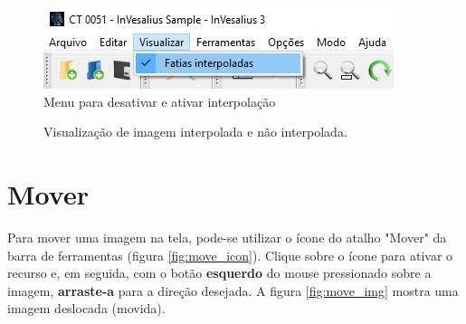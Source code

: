 \begin{figure}[!htb]
\centering
\includegraphics[scale=0.6]{../user_guide_figures/invesalius_screen/menu_interpoleted_image_pt.png}
\caption{Menu para desativar e ativar interpolação}
\label{fig:menu_interpoleted_image_pt}
\end{figure}


\begin{figure}[!htb]
  \centering
    \qquad
  \hfill
  \caption{Visualização de imagem interpolada e não interpolada.}
  \label{fig:interp}
\end{figure}

\section{Mover}

Para mover uma imagem na tela, pode-se utilizar o ícone do atalho "Mover" da barra de ferramentas (figura
\ref{fig:move_icon}). Clique sobre o ícone para ativar o recurso e, em seguida, com o botão
\textbf{esquerdo} do mouse pressionado sobre a imagem, \textbf{arraste-a} para a direção desejada.
A figura \ref{fig:move_img} mostra uma imagem deslocada (movida).

